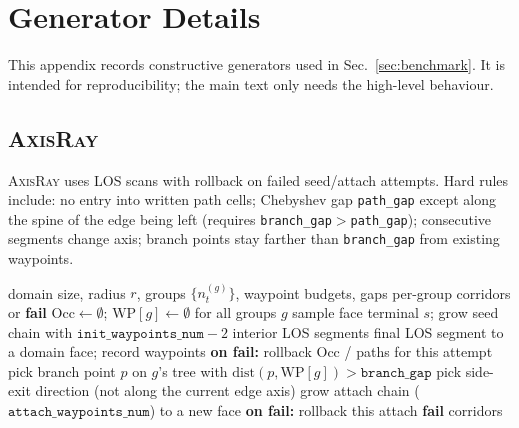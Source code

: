 
\section{Generator Details}
\label{app:generators}

This appendix records constructive generators used in Sec.~\ref{sec:benchmark}.
It is intended for reproducibility; the main text only needs the high-level
behaviour.

\subsection{\textsc{AxisRay}}
\label{app:axis-ray}

\textsc{AxisRay} uses LOS scans with rollback on failed seed/attach attempts.
Hard rules include: no entry into written path cells; Chebyshev gap
\texttt{path\_gap} except along the spine of the edge being left (requires
\texttt{branch\_gap}$>$\texttt{path\_gap}); consecutive segments change axis;
branch points stay farther than \texttt{branch\_gap} from existing waypoints.

\begin{algorithm}[t]
\caption{\textsc{AxisRay}: generate witness corridors}
\label{alg:axis-ray}
\begin{algorithmic}[1]
\Require domain size, radius $r$, groups $\{n_t^{(g)}\}$, waypoint budgets, gaps
\Ensure per-group corridors or \textbf{fail}
\State $\mathrm{Occ}\gets\emptyset$; $\mathrm{WP}[g]\gets\emptyset$ for all groups $g$
      \State sample face terminal $s$; grow seed chain with
             $\texttt{init\_waypoints\_num}{-}2$ interior LOS segments
      \State final LOS segment to a domain face; record waypoints
      \State \textbf{on fail:} rollback $\mathrm{Occ}$ / paths for this attempt
    \Else
      \State pick branch point $p$ on $g$'s tree with
             $\mathrm{dist}(p,\mathrm{WP}[g])>\texttt{branch\_gap}$
      \State pick side-exit direction (not along the current edge axis)
      \State grow attach chain ($\texttt{attach\_waypoints\_num}$) to a new face
      \State \textbf{on fail:} rollback this attach
    \EndIf
  \EndFor
    \State \Return \textbf{fail}
  \EndIf
\EndWhile
\State \Return corridors
\end{algorithmic}
\end{algorithm}

